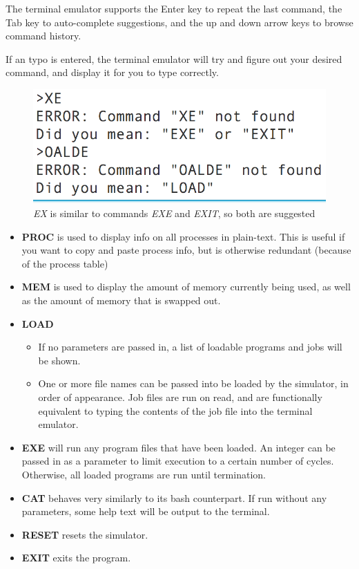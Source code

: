 \documentclass[paper=a4, fontsize=11pt]{scrartcl} %
\numberwithin{equation}{section} %
\numberwithin{figure}{section} %
\numberwithin{table}{section} %
\begin{document}
The terminal emulator supports the Enter key to repeat the last command, the Tab key to auto-complete suggestions, and the up and down arrow keys to browse command history.

If an typo is entered, the terminal emulator will try and figure out your desired command, and display it for you to type correctly.

\begin{figure}[H]
  \centering
    \includegraphics[scale=.5]{Typo.png}
  \caption{ \textit{EX} is similar to commands \textit{EXE} and \textit{EXIT}, so both are suggested}
\end{figure}

\begin{itemize}
	\item \textbf{PROC} is used to display info on all processes in plain-text. This is useful if you want to copy and paste process info, but is otherwise redundant (because of the process table)
	\item \textbf{MEM} is used to display the amount of memory currently being used, as well as the amount of memory that is swapped out.
	\item \textbf{LOAD}
		\begin{itemize}
			\item If no parameters are passed in, a list of loadable programs and jobs will be shown.
			\item One or more file names can be passed into be loaded by the simulator, in order of appearance. Job files are run on read, and are functionally equivalent to typing the contents of the job file into the terminal emulator.
		\end{itemize}
	\item \textbf{EXE} will run any program files that have been loaded. An integer can be passed in as a parameter to limit execution to a certain number of cycles. Otherwise, all loaded programs are run until termination.
	\item \textbf{CAT} behaves very similarly to its bash counterpart. If run without any parameters, some help text will be output to the terminal.
	\item \textbf{RESET} resets the simulator.
	\item \textbf{EXIT} exits the program.
\end{itemize}
\end{document}
